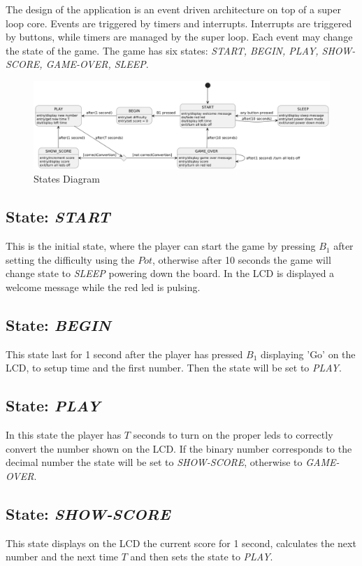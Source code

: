 \documentclass[a4paper,12pt]{report}
\begin{document}
    The design of the application is an event driven architecture on top of a super loop core. 
    Events are triggered by timers and interrupts. Interrupts are triggered by buttons, while timers are managed by the super loop. Each event may change the state of the game.
    The game has six states: \textit{START, BEGIN, PLAY, SHOW-SCORE, GAME-OVER, SLEEP}. 

    \begin{figure}[H]
        	\centering{}
        	\includegraphics[width=\textwidth]{relazione/img/Assignment-01_UML-Full-States-Diagram.png}
        	\caption{States Diagram}
        	\label{img:states_diagram}
    \end{figure} 
    
    \subsection{State: \textit{START}}
        This is the initial state, where the player can start the game by pressing $B_1$ after setting the difficulty using the $Pot$, otherwise after 10 seconds the game will change state to \textit{SLEEP} powering down the board. In the LCD is displayed a welcome message while the red led is pulsing. 
    \subsection{State: \textit{BEGIN}}
        This state last for 1 second after the player has pressed $B_1$ displaying 'Go' on the LCD, to setup time and the first number. Then the state will be set to \textit{PLAY}.
    \subsection{State: \textit{PLAY}}
        In this state the player has $T$ seconds to turn on the proper leds to correctly convert the number shown on the LCD. If the binary number corresponds to the decimal number the state will be set to \textit{SHOW-SCORE}, otherwise to \textit{GAME-OVER}.
    \subsection{State: \textit{SHOW-SCORE}}
        This state displays on the LCD the current score for 1 second, calculates the next number and the next time $T$ and then sets the state to \textit{PLAY}.
\end{document}

